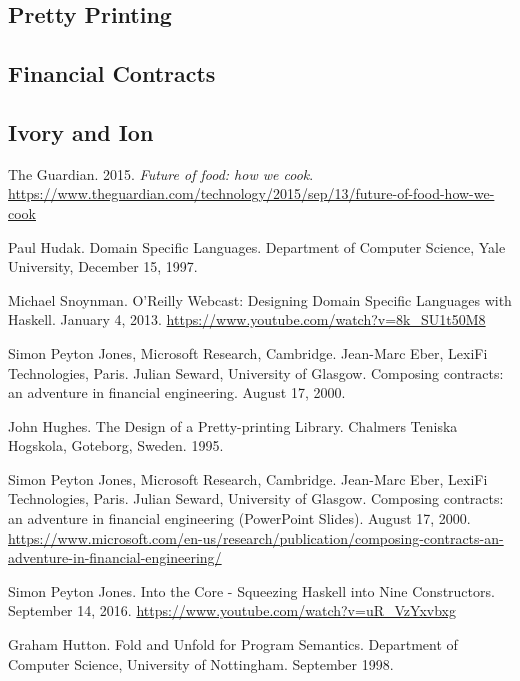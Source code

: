 \documentclass[11pt]{article}
\begin{document}
        \subsection{Pretty Printing}
        \subsection{Financial Contracts}
        \subsection{Ivory and Ion}
    \newpage

    \begin{thebibliography}{8}

        The Guardian. 2015. \textit{Future of food: how we cook}.
        \url{https://www.theguardian.com/technology/2015/sep/13/future-of-food-how-we-cook}

        Paul Hudak. Domain Specific Languages. Department of Computer
        Science, Yale University, December 15, 1997.

        Michael Snoynman. O'Reilly Webcast: Designing Domain Specific
        Languages with Haskell. January 4, 2013.
        \url{https://www.youtube.com/watch?v=8k_SU1t50M8}

        Simon Peyton Jones, Microsoft Research, Cambridge.
        Jean-Marc Eber, LexiFi Technologies, Paris. Julian Seward,
        University of Glasgow. Composing contracts: an adventure in
        financial engineering. August 17, 2000.

        John Hughes. The Design of a Pretty-printing Library.
        Chalmers Teniska Hogskola, Goteborg, Sweden. 1995.

        Simon Peyton Jones, Microsoft Research, Cambridge.
        Jean-Marc Eber, LexiFi Technologies, Paris. Julian Seward,
        University of Glasgow. Composing contracts: an adventure in
        financial engineering (PowerPoint Slides). August 17, 2000.
        \url{https://www.microsoft.com/en-us/research/publication/composing-contracts-an-adventure-in-financial-engineering/}

        Simon Peyton Jones. Into the Core - Squeezing Haskell into
        Nine Constructors. September 14, 2016.
        \url{https://www.youtube.com/watch?v=uR_VzYxvbxg}

        Graham Hutton. Fold and Unfold for Program Semantics. Department of
        Computer Science, University of Nottingham. September 1998.

    \end{thebibliography}   

    \newpage

    \appendix
\end{document}
